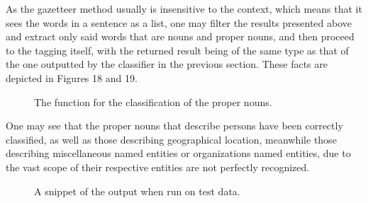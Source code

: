 \documentclass[12pt,a4paper]{article}
\begin{document}
\qquad As the gazetteer method usually is insensitive to the context, which means that it sees the words in a sentence as a list, one may filter the results presented above and extract only said words that are nouns and proper nouns, and then proceed to the tagging itself, with the returned result being of the same type as that of the one outputted by the classifier in the previous section. These facts are depicted in Figures 18 and 19.

\begin{figure}[h!]
\begin{center}
\end{center}
\caption{The function for the classification of the proper nouns.}
\end{figure}

\qquad One may see that the proper nouns that describe persons have been correctly classified, as well as those describing geographical location, meanwhile those describing miscellaneous named entities or organizations named entities, due to the vast scope of their respective entities are not perfectly recognized.

\begin{figure}[h!]
\begin{center}
\end{center}
\caption{A snippet of the output when run on test data.}
\end{figure}
\end{document}
